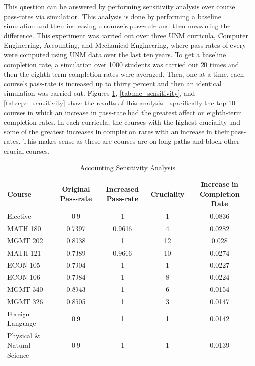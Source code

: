 \documentclass[botnum, fleqn]{unmeethesis}
\begin{document}
    This question can be answered by performing sensitivity analysis over course pass-rates via simulation. This analysis is done by performing a baseline simulation and then increasing a course's pass-rate and then measuring the difference. This experiment was carried out over three UNM curricula, Computer Engineering, Accounting, and Mechanical Engineering, where pass-rates of every were computed using UNM data over the last ten years. To get a baseline completion rate, a simulation over 1000 students was carried out 20 times and then the eighth term completion rates were averaged. Then, one at a time, each course's pass-rate is increased up to thirty percent and then an identical simulation was carried out. Figures \ref{tab:accounting_sensitivity}, \ref{tab:me_sensitivity}, and \ref{tab:cpe_sensitivity} show the results of this analysis - specifically the top 10 courses in which an increase in pass-rate had the greatest affect on eighth-term completion rates. In each curricula, the courses with the highest cruciality had some of the greatest increases in completion rates with an increase in their pass-rates. This makes sense as these are courses are on long-paths and block other crucial courses.

    \begin{table}[!h]
    \tiny
    \begin{tabular}{l*{4}{c}}
    Course & Original Pass-rate & Increased Pass-rate & Cruciality & Increase in Completion Rate \\
    \hline
    Elective & 0.9 & 1 & 1 & 0.0836 \\
    MATH 180 & 0.7397 & 0.9616 & 4 & 0.0282 \\
    MGMT 202 & 0.8038 & 1 & 12 & 0.028 \\
    MATH 121 & 0.7389 & 0.9606 & 10 & 0.0274 \\
    ECON 105 & 0.7904 & 1 & 1 & 0.0227 \\
    ECON 106 & 0.7984 & 1 & 8 & 0.0224 \\
    MGMT 340 & 0.8943 & 1 & 6 & 0.0154 \\
    MGMT 326 & 0.8605 & 1 & 3 & 0.0147 \\
    Foreign Language & 0.9 & 1 & 1 & 0.0142 \\
    Physical \& Natural Science & 0.9 & 1 & 1 & 0.0139 \\
    \end{tabular}
    \caption{Accounting Sensitivity Analysis} 
    \label{tab:accounting_sensitivity}
    \end{table}
\end{document}
